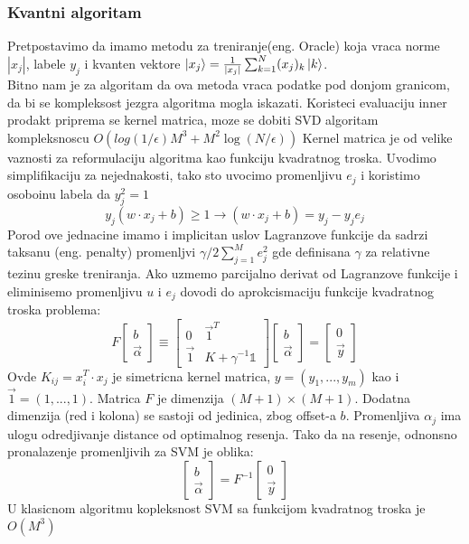\documentclass[12pt, letterpaper, oneside]{article}
\begin{document}
\subsubsection{Kvantni algoritam}
Pretpostavimo da imamo metodu za treniranje(eng. Oracle) koja vraca norme $|x_j|$, labele $y_j$ 
i kvanten vektore $\Ket{x_j} = \frac{1}{|x_j|}\sum_{k=1}^{N}(x_j)_k\Ket{k}$. \\
Bitno nam je za algoritam da ova metoda vraca podatke pod donjom granicom, da bi se kompleksost jezgra algoritma mogla iskazati.
Koristeci evaluaciju inner prodakt priprema se kernel matrica, moze se dobiti SVD algoritam kompleksnoscu $O(log(1/\epsilon)M^3 + M^{2}\log(N/\epsilon))$
Kernel matrica je od velike vaznosti za reformulaciju algoritma kao funkciju kvadratnog troska. 
Uvodimo simplifikaciju za nejednakosti, tako sto uvocimo promenljivu $e_j$ i koristimo osoboinu labela da $y_j^2=1$
\[
    y_{j}(w \cdot x_j + b) \geq 1 \to (w \cdot x_j + b) = y_{j} - y_{j}e_{j}
\]
Porod ove jednacine imamo i implicitan uslov Lagranzove funkcije da sadrzi taksanu (eng. penalty) promenljvi
$\gamma/2\sum_{j=1}^{M}e_j^2$ gde definisana $\gamma$ za relativne tezinu greske treniranja.
Ako uzmemo parcijalno derivat od Lagranzove funkcije i eliminisemo promenljivu $u$ i $e_j$ dovodi do aprokcismaciju funkcije kvadratnog troska problema:
\[
    F\begin{bmatrix}
        b \\
        \overrightarrow{\alpha}
    \end{bmatrix}
    \equiv \begin{bmatrix}
        0 & \overrightarrow{1}^T \\
        \overrightarrow{1} & K+\gamma^{-1} \mathbb{1}
    \end{bmatrix}
    \begin{bmatrix}
        b \\
        \overrightarrow{\alpha}
    \end{bmatrix} =
    \begin{bmatrix}
        0 \\
        \overrightarrow{y}
    \end{bmatrix}
\]
Ovde $K_{ij} = x_i^T \cdot x_j$ je simetricna kernel matrica, $y = (y_1,...,y_m)$ kao i
$\overrightarrow{1} = (1,...,1)$. Matrica $F$ je dimenzija $(M+1)\times(M+1)$. Dodatna dimenzija (red i kolona) se sastoji od jedinica,
zbog offset-a $b$. Promenljiva $\alpha_j$ ima ulogu odredjivanje distance od optimalnog resenja. Tako da na resenje, odnonsno
pronalazenje promenljivih za SVM je oblika:
\[
    \begin{bmatrix}
        b \\
        \overrightarrow{\alpha}
    \end{bmatrix} =
    F^{-1} \begin{bmatrix}
        0 \\
        \overrightarrow{y}
    \end{bmatrix}
\]
U klasicnom algoritmu kopleksnost SVM sa funkcijom kvadratnog troska je $O(M^3)$ 
\end{document}
